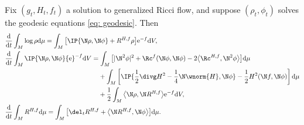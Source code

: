 \begin{Lemma}\label{lem: evolution entropy 2} Fix $(g_t, H_t, f_t)$ a solution to generalized Ricci flow, and suppose $(\rho_t,\phi_t)$ solves the geodesic equations \eqref{eq: geodesic}. Then
	\begin{align*}
	&\frac{{\rm d}}{{\rm d}t} \int_M \log\rho {\rm d}\mu= \int_M \big[\IP{\N\rho,\N\phi}+R^{H,f}\rho \big]{\rm e}^{-f} {\rm d}V,\\
	&\frac{{\rm d}}{{\rm d}t} \int_M \IP{\N\rho,\N\phi}{\rm e}^{-f} {\rm d}V=\int_M \big[|\N^2\phi|^2+\Rc^f(\N\phi,\N\phi)-2\big\langle\Rc^{H,f},\N^2\phi\big\rangle \big] {\rm d}\mu\\
	&\phantom{\frac{{\rm d}}{{\rm d}t} \int_M \IP{\N\rho,\N\phi}{\rm e}^{-f} {\rm d}V=}{} +\int_M \left[ \IP{\frac12\divg H^2 - \frac1{4}\N\wnorm{H},\N \phi} - \frac12 H^2(\N f, \N \phi) \right] {\rm d}\mu\\
	&\phantom{\frac{{\rm d}}{{\rm d}t} \int_M \IP{\N\rho,\N\phi}{\rm e}^{-f} {\rm d}V=}{} +\frac12\int_M \big\langle\N\rho,\N R^{H,f}\big\rangle{\rm e}^{-f} {\rm d}V,\\
	&\frac{{\rm d}}{{\rm d}t}\int_M R^{H,f} {\rm d}\mu
	=\int_M \big[ \del_t R^{H,f} +\big\langle\N R^{H,f},\N\phi\big\rangle \big] {\rm d}\mu.
	\end{align*}
\end{Lemma}
